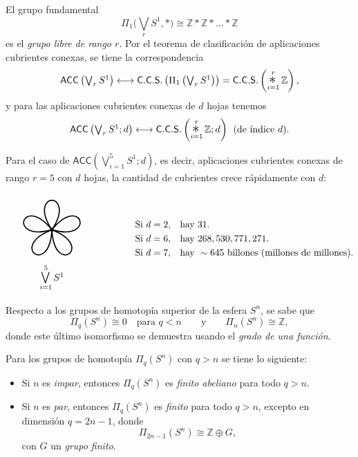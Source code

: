 \begin{nota}
El grupo fundamental
\[
\Pi_1\big(\textstyle \bigvee_r S^1, * \big) \cong {\mathbb{Z} \ast \mathbb{Z} \ast \dots \ast \mathbb{Z}}
\]
es el \textit{grupo libre de rango $r$}. Por el teorema de clasificación de aplicaciones cubrientes conexas, se tiene la correspondencia
\[
\mathsf{ACC}\left(\textstyle \bigvee_r S^1 \right) \longleftrightarrow \mathsf{C.C.S.}\left( \Pi_1\left( \textstyle\bigvee_r S^1 \right) \right) = \mathsf{C.C.S.}\left( \mathop{\scalebox{1.5}{$\ast$}}_{i=1}^r \mathbb{Z} \right),
\]
y para las aplicaciones cubrientes conexas de $d$ hojas tenemos
\[
\mathsf{ACC}\left( \textstyle\bigvee_r S^1 ; d \right) \longleftrightarrow {\mathsf{C.C.S.}\left( \mathop{\scalebox{1.5}{$\ast$}}_{i=1}^r \mathbb{Z} ; d \right)} \;\text{ (de índice $d$).}
\]

\end{nota}
\begin{ejemplo}
Para el caso de $\mathsf{ACC}\left(\bigvee_{i=1}^5 S^1; d\right)$, es decir, aplicaciones cubrientes conexas de rango $r = 5$ con $d$ hojas, la cantidad de cubrientes crece rápidamente con $d$:
\[
\begin{tikzpicture}[baseline=(current bounding box.center), scale=0.95]
    \foreach \ang in {18, 90, 162, 234, 306} {
        \draw[very thick, rotate=\ang] (0,0) .. controls (1.55, 1.02) and (1.55, -1.02) .. (0,0);
    }
    \filldraw (0,0) circle (1.8pt);
    \node[below] at (0, -1.25) {$\mathop{\medvee}\limits_{i=1}^5 S^1$};
\end{tikzpicture}
\qquad \qquad
\begin{aligned}
    \text{Si } d &= 2, & &\text{hay } 31. \\
    \text{Si } d &= 6, & &\text{hay } 268,530,771,271. \\
    \text{Si } d &= 7, & &\text{hay } \sim 645 \text{ billones (millones de millones)}.
\end{aligned}
\]
\end{ejemplo}

Respecto a los grupos de homotopía superior de la esfera $S^n$, se sabe que
\[
\Pi_q(S^n) \cong 0 \quad \text{para } q < n \qquad \text{y} \qquad \Pi_n(S^n) \cong \mathbb{Z},
\]
donde este último isomorfismo se demuestra usando el \textit{grado de una función}.

\begin{teorema}[Serre]
Para los grupos de homotopía $\Pi_q(S^n)$ con $q > n$ se tiene lo siguiente:
\begin{itemize}
    \item Si $n$ es \textit{impar}, entonces $\Pi_q(S^n)$ es \textit{finito abeliano} para todo $q > n$.
    \item Si $n$ es \textit{par}, entonces $\Pi_q(S^n)$ es \textit{finito} para todo $q > n$, excepto en dimensión $q = 2n - 1$, donde
    \[
    \Pi_{2n-1}(S^n) \cong \mathbb{Z} \oplus G,
    \]
    con $G$ un \textit{grupo finito}.
\end{itemize}
\end{teorema}

